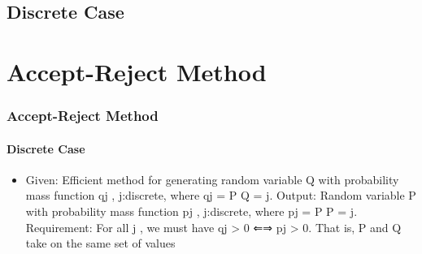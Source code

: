 \documentclass{beamer}
\begin{document}
\subsection{Discrete Case}

\section{Accept-Reject Method}

\begin{frame}
    \frametitle{Accept-Reject Method}
    \framesubtitle{Discrete Case }
	\begin{itemize}
		\item Given: Efficient method for generating random variable Q with probability mass
function {qj , j:discrete}, where qj = P {Q = j}.
Output: Random variable P with probability mass function {pj , j:discrete}, where
pj = P {P = j}.
Requirement: For all j , we must have qj > 0 ⇐⇒ pj > 0. That is, P and Q take on
the same set of values
		  
	\end{itemize}	   
    
\end{frame}
    
\end{document}
